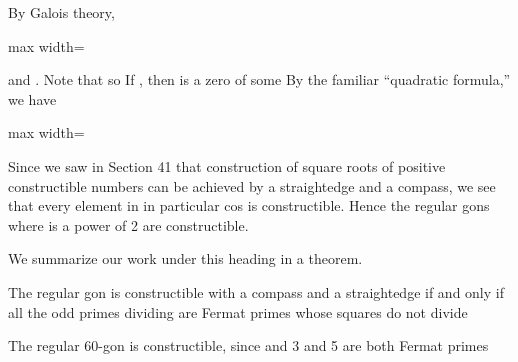 \documentclass[11pt,oneside]{article}
\begin{document}
\begin{BookBody}
\noindent By Galois theory,

\begin{center}\begin{adjustbox}{max width=\linewidth}\end{adjustbox}\end{center}

\noindent and . Note that  so  If , then  is a zero of some  By the familiar “quadratic formula,” we have

\begin{center}\begin{adjustbox}{max width=\linewidth}\end{adjustbox}\end{center}

\noindent Since we saw in Section 41 that construction of square roots of positive constructible numbers can be achieved by a straightedge and a compass, we see that every element in  in particular cos is constructible. Hence the regular gons where  is a power of 2 are constructible.

We summarize our work under this heading in a theorem.

 The regular gon is constructible with a compass and a straightedge if and only if all the odd primes dividing  are Fermat primes whose squares do not divide 

 The regular 60-gon is constructible, since  and 3 and 5 are both Fermat primes\BookEnd{\blacktriangle}

\end{BookBody}

\BookNarrativefalse
\end{document}
